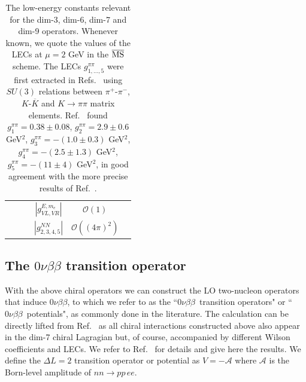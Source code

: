 \documentclass[letterpaper,11pt]{article}
\newcommand{\Dt}{\Delta}
\newcommand{\Or}{\mathcal O}
\newcommand{\NLDBD}{$0 \nu \beta \beta$}
\begin{document}
\begin{table}
\begin{tabular}{|c|cc||c|cc|}
			   &&&$ |g_{VL,VR}^{E,m_e}|$ &$\Or(1)$&\\
			   			   &&&            $ |g^{NN}_{2,3,4,5}|$ & $ \mathcal{O}((4\pi)^2) $ &   
\\\hline
\end{tabular}
\caption{The low-energy constants relevant for the dim-3, dim-6, dim-7 and dim-9 operators. 
Whenever known,  we quote the values of the LECs at $\mu=2$ GeV in the $\overline{\rm MS}$ scheme.
The LECs $g_{1, \ldots, 5}^{\pi\pi}$ were first extracted in Refs.\ \cite{Savage:1998yh,Cirigliano:2017ymo} using 
$SU(3)$ relations between $\pi^+$-$\pi^-$, $K$-$\overline{K}$ and $K \rightarrow \pi \pi$  matrix elements. Ref.\ \cite{Cirigliano:2017ymo} found
$g^{\pi\pi}_{1} = 0.38 \pm 0.08$, $g^{\pi\pi}_{2} = 2.9 \pm 0.6$ GeV$^2$, $g^{\pi\pi}_{3} = -( 1.0 \pm 0.3)$ GeV$^2$, $g^{\pi\pi}_{4} = -(2.5 \pm 1.3)$ GeV$^2$, $g^{\pi\pi}_{5} = -(11 \pm 4)$ GeV$^2$,
in good agreement with the more precise results of Ref.\ \cite{Nicholson:2018mwc}.}  
\label{Tab:LECs}
\end{table}



\subsection{The $0\nu\beta\beta$ transition operator}
With the above chiral operators we can construct the LO two-nucleon operators  that induce $0\nu\beta\beta$, {to which we refer to as the ``\NLDBD\  transition operators" 
or ``\NLDBD\ potentials",  as commonly  done in the literature. 
 The calculation can be directly lifted from Ref.~\cite{Cirigliano:2017djv} as all chiral interactions constructed above also appear in the dim-7 chiral Lagragian but, of course, accompanied by different Wilson coefficients and LECs. We refer to Ref.~\cite{Cirigliano:2017djv} for details and give here the results. We define the $\Dt L=2$  transition operator or} potential as $V=-\mathcal A$ where $\mathcal A$ is the 
Born-level  amplitude of $nn\rightarrow pp\,ee$.
\end{document}
